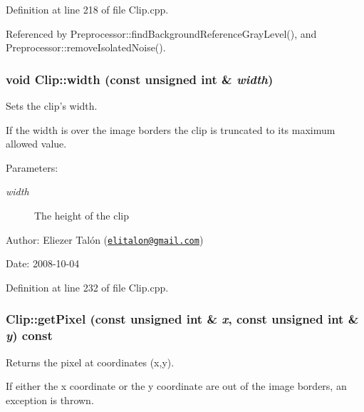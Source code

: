Definition at line 218 of file Clip.cpp.

Referenced by Preprocessor::findBackgroundReferenceGrayLevel(), and Preprocessor::removeIsolatedNoise().\hypertarget{class_clip_bfb1bc4bf1a16c05493f5d6d03ba2498}{
\subsubsection[width]{\setlength{\rightskip}{0pt plus 5cm}void Clip::width (const unsigned int \& {\em width})}}
\label{class_clip_bfb1bc4bf1a16c05493f5d6d03ba2498}


Sets the clip's width. 

If the width is over the image borders the clip is truncated to its maximum allowed value.

\begin{Desc}
\item[Parameters:]
\begin{description}
\item[{\em width}]The height of the clip\end{description}
\end{Desc}
\begin{Desc}
\item[Author:]Eliezer Talón (\href{mailto:elitalon@gmail.com}{\tt elitalon@gmail.com}) \end{Desc}
\begin{Desc}
\item[Date:]2008-10-04 \end{Desc}


Definition at line 232 of file Clip.cpp.\hypertarget{class_clip_260bfb94abaa9d2df692ba33146cc62e}{
\subsubsection[getPixel]{ Clip::getPixel (const unsigned int \& {\em x}, \/  const unsigned int \& {\em y}) const}}
\label{class_clip_260bfb94abaa9d2df692ba33146cc62e}


Returns the pixel at coordinates (x,y). 

If either the x coordinate or the y coordinate are out of the image borders, an exception is thrown.

